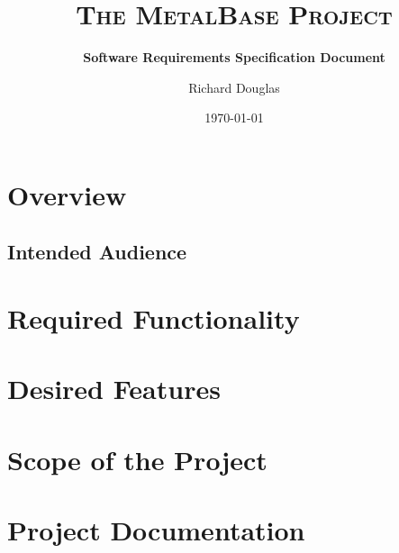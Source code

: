 \documentclass{article}[12pt,a4paper]
\title{\textsc{The MetalBase Project}}
\subtitle{\textbf{Software Requirements Specification Document}}
\author{\Large{Richard Douglas}}
\date{\today{}}
\begin{document}
  \maketitle
  
  \section*{Overview}
  
  \subsection*{Intended Audience}
  
  \tableofcontents
  
  \section{Required Functionality}
  
  \section{Desired Features}
  
  \section{Scope of the Project}
  
  \section{Project Documentation}
  
\end{document}
